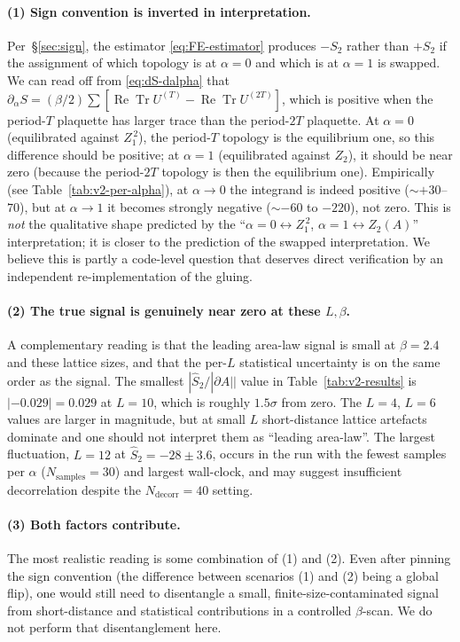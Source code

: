 \documentclass[11pt,a4paper]{article}
\theoremstyle{definition}
\newcommand{\Tr}{\operatorname{Tr}}
\renewcommand{\Re}{\operatorname{Re}}
\begin{document}
\paragraph{(1) Sign convention is inverted in interpretation.}
Per~\S\ref{sec:sign}, the estimator \eqref{eq:FE-estimator} produces
$-S_2$ rather than $+S_2$ if the assignment of which topology is at
$\alpha = 0$ and which is at $\alpha = 1$ is swapped. We can read
off from \eqref{eq:dS-dalpha} that
$\partial_\alpha S = (\beta/2)\sum [\Re\Tr U^{(T)} - \Re\Tr U^{(2T)}]$,
which is positive when the period-$T$ plaquette has larger trace
than the period-$2T$ plaquette. At $\alpha = 0$ (equilibrated against
$Z_1^{\,2}$), the period-$T$ topology is the equilibrium one, so this
difference should be positive; at $\alpha = 1$ (equilibrated against
$Z_2$), it should be near zero (because the period-$2T$ topology is
then the equilibrium one). Empirically (see
Table~\ref{tab:v2-per-alpha}), at $\alpha \to 0$ the integrand is
indeed positive ($\sim +30$--$70$), but at $\alpha \to 1$ it becomes
strongly negative ($\sim -60$ to $-220$), not zero. This is
\emph{not} the qualitative shape predicted by the
``$\alpha = 0 \leftrightarrow Z_1^{\,2}$, $\alpha = 1 \leftrightarrow
Z_2(A)$'' interpretation; it is closer to the prediction of the
swapped interpretation. We believe this is partly a code-level
question that deserves direct verification by an independent
re-implementation of the gluing.

\paragraph{(2) The true signal is genuinely near zero at these
$L,\beta$.} A complementary reading is that the leading area-law
signal is small at $\beta = 2.4$ and these lattice sizes, and that
the per-$L$ statistical uncertainty is on the same order as the
signal. The smallest $|\widehat S_2/|\partial A||$ value in
Table~\ref{tab:v2-results} is $|{-}0.029| = 0.029$ at $L = 10$,
which is roughly $1.5\sigma$ from zero. The $L = 4$, $L = 6$
values are larger in magnitude, but at small $L$ short-distance
lattice artefacts dominate and one should not interpret them as
``leading area-law''. The largest fluctuation, $L = 12$ at
$\widehat S_2 = -28 \pm 3.6$, occurs in the run with the fewest
samples per $\alpha$ ($N_{\mathrm{samples}} = 30$) and largest wall-clock,
and may suggest insufficient decorrelation despite the
$N_{\mathrm{decorr}} = 40$ setting.

\paragraph{(3) Both factors contribute.} The most realistic reading
is some combination of (1) and (2). Even after pinning the sign
convention (the difference between scenarios (1) and (2) being a
global flip), one would still need to disentangle a small,
finite-size-contaminated signal from short-distance and statistical
contributions in a controlled $\beta$-scan. We do not perform that
disentanglement here.
\end{document}
